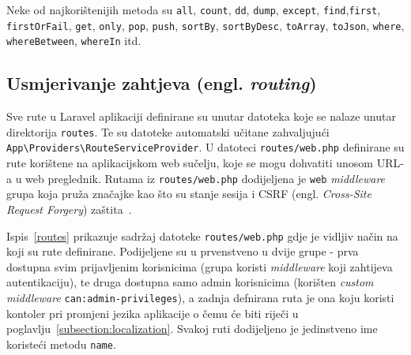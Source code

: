 Neke od najkorištenijih metoda su \texttt{all}, \texttt{count}, \texttt{dd}, \texttt{dump}, \texttt{except}, \texttt{find},\texttt{first}, \texttt{firstOrFail}, \texttt{get}, \texttt{only}, \texttt{pop}, \texttt{push}, \texttt{sortBy}, \texttt{sortByDesc}, \texttt{toArray}, \texttt{toJson}, \texttt{where}, \texttt{whereBetween}, \texttt{whereIn} itd.~\cite{collections}

\subsection{Usmjerivanje zahtjeva (engl. \textit{routing})}
Sve rute u Laravel aplikaciji definirane su unutar datoteka koje se nalaze unutar direktorija \texttt{routes}. Te su datoteke automatski učitane zahvaljujući \\ \texttt{App\textbackslash Providers\textbackslash RouteServiceProvider}. U datoteci \texttt{routes/web.php} definirane su rute korištene na aplikacijskom web sučelju, koje se mogu dohvatiti unosom URL-a u web preglednik. Rutama iz \texttt{routes/web.php} dodijeljena je \texttt{web} \textit{middleware} grupa koja pruža značajke kao što su stanje sesija i CSRF (engl. \textit{Cross-Site Request Forgery}) zaštita~\cite{routing}.

Ispis~\ref{routes} prikazuje sadržaj datoteke \texttt{routes/web.php} gdje je vidljiv način na koji su rute definirane. Podijeljene su u prvenstveno u dvije grupe - prva dostupna svim prijavljenim korisnicima (grupa koristi \textit{middleware} koji zahtijeva autentikaciju), te druga dostupna samo admin korisnicima (korišten \textit{custom} \textit{middleware} \texttt{can:admin-privileges}), a zadnja defnirana ruta je ona koju koristi kontoler pri promjeni jezika aplikacije o čemu će biti riječi u poglavlju~\ref{subsection:localization}. Svakoj ruti dodijeljeno je jedinstveno ime koristeći metodu \texttt{name}.

